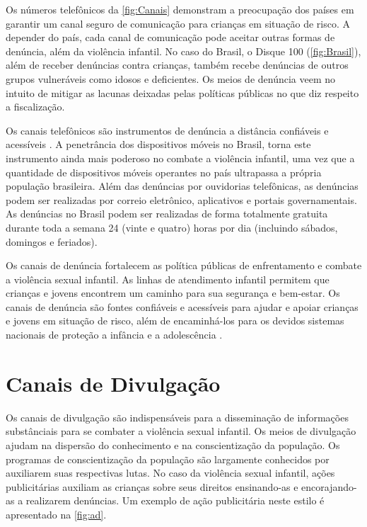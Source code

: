 Os números telefônicos da \autoref{fig:Canais} demonstram a preocupação dos países em garantir um canal seguro de comunicação para crianças em situação de risco. A depender do país, cada canal de comunicação pode aceitar outras formas de denúncia, além da violência infantil. No caso do Brasil, o Disque 100 (\autoref{fig:Brasil}), além de receber denúncias contra crianças, também recebe denúncias de outros grupos vulneráveis como idosos e deficientes. Os meios de denúncia veem no intuito de mitigar as lacunas deixadas pelas políticas públicas no que diz respeito a fiscalização.

Os canais telefônicos são instrumentos de denúncia a distância confiáveis e acessíveis \cite{UNICEF2017new}. A penetrância dos dispositivos móveis no Brasil, torna este instrumento ainda mais poderoso no combate a violência infantil, uma vez que a quantidade de dispositivos móveis operantes no país ultrapassa a própria população brasileira. Além das denúncias por ouvidorias telefônicas, as denúncias podem ser realizadas por correio eletrônico, aplicativos e portais governamentais. As denúncias no Brasil podem ser realizadas de forma totalmente gratuita durante toda a semana 24 (vinte e quatro) horas por dia (incluindo sábados, domingos e feriados).

Os canais de denúncia fortalecem as política públicas de enfrentamento e combate a violência sexual infantil. As linhas de atendimento infantil permitem que crianças e jovens encontrem um caminho para sua segurança e bem-estar. Os canais de denúncia são fontes confiáveis e acessíveis para ajudar e apoiar crianças e jovens em situação de risco, além de encaminhá-los para os devidos sistemas nacionais de proteção a infância e a adolescência \cite{UNICEF2017new}.


\section{Canais de Divulgação}\label{sec:propagandas}

Os canais de divulgação são indispensáveis para a disseminação de informações substânciais para se combater a violência sexual infantil. Os meios de divulgação ajudam na dispersão do conhecimento e na conscientização da população. Os programas de conscientização da população são largamente conhecidos por auxiliarem suas respectivas lutas. %
No caso da violência sexual infantil, ações publicitárias auxiliam as crianças sobre seus direitos ensinando-as e encorajando-as a realizarem denúncias. Um exemplo de ação publicitária neste estilo é apresentado na \autoref{fig:ad}.

